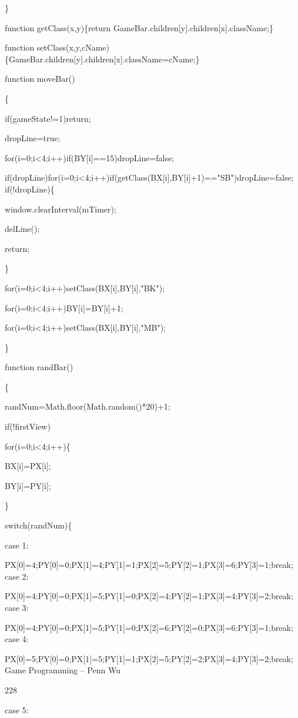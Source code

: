\documentclass[
]{article}
\begin{document}
\}

function getClass(x,y)\{return
GameBar.children{[}y{]}.children{[}x{]}.className;\}

function
setClass(x,y,cName)\{GameBar.children{[}y{]}.children{[}x{]}.className=cName;\}

function moveBar()

\{

if(gameState!=1)return;

dropLine=true;

for(i=0;i\textless4;i++)if(BY{[}i{]}==15)dropLine=false;

if(dropLine)for(i=0;i\textless4;i++)if(getClass(BX{[}i{]},BY{[}i{]}+1)=="SB")dropLine=false;
if(!dropLine)\{

window.clearInterval(mTimer);

delLine();

return;

\}

for(i=0;i\textless4;i++)setClass(BX{[}i{]},BY{[}i{]},"BK");

for(i=0;i\textless4;i++)BY{[}i{]}=BY{[}i{]}+1;

for(i=0;i\textless4;i++)setClass(BX{[}i{]},BY{[}i{]},"MB");

\}

function randBar()

\{

randNum=Math.floor(Math.random()*20)+1;

if(!firstView)

for(i=0;i\textless4;i++)\{

BX{[}i{]}=PX{[}i{]};

BY{[}i{]}=PY{[}i{]};

\}

switch(randNum)\{

case 1:

PX{[}0{]}=4;PY{[}0{]}=0;PX{[}1{]}=4;PY{[}1{]}=1;PX{[}2{]}=5;PY{[}2{]}=1;PX{[}3{]}=6;PY{[}3{]}=1;break;
case 2:

PX{[}0{]}=4;PY{[}0{]}=0;PX{[}1{]}=5;PY{[}1{]}=0;PX{[}2{]}=4;PY{[}2{]}=1;PX{[}3{]}=4;PY{[}3{]}=2;break;
case 3:

PX{[}0{]}=4;PY{[}0{]}=0;PX{[}1{]}=5;PY{[}1{]}=0;PX{[}2{]}=6;PY{[}2{]}=0;PX{[}3{]}=6;PY{[}3{]}=1;break;
case 4:

PX{[}0{]}=5;PY{[}0{]}=0;PX{[}1{]}=5;PY{[}1{]}=1;PX{[}2{]}=5;PY{[}2{]}=2;PX{[}3{]}=4;PY{[}3{]}=2;break;
Game Programming -- Penn Wu

228

\protect\hypertarget{index_split_011.htmlux5cux23p229}{}{} case 5:
\end{document}
